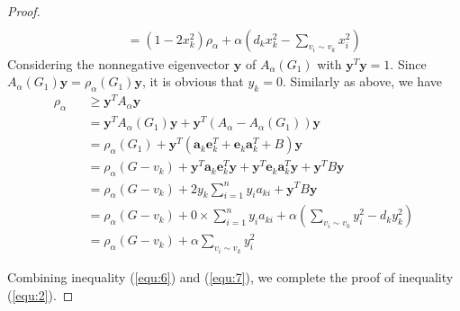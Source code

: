 \documentclass[amsthm]{elsart}
\begin{document}
\begin{proof}
\begin{eqnarray}
\\  \label{equ:6} &&= ( 1 -2 x_k^2)\rho_\alpha + \alpha (d_k x_k^2 - \sum \limits_{v_i \sim v_k}^{} x_i^2 )
\end{eqnarray}
Considering the nonnegative eigenvector $\textbf{y}$ of $A_\alpha(G_1)$ with $\textbf{y}^T\textbf{y} = 1$. Since $A_\alpha(G_1) \textbf{y} = \rho_\alpha(G_1) \textbf{y}$, it is obvious that $y_k = 0$.
Similarly as above, we have \\
\begin{eqnarray}
\nonumber  \rho_\alpha
&&\geqslant \textbf{y} ^T A_\alpha \textbf{y}
\\ \nonumber &&= \textbf{y} ^T A_\alpha(G_1) \textbf{y} + \textbf{y}^T (A_\alpha - A_\alpha(G_1)) \textbf{y}
\\ \nonumber &&= \rho_\alpha(G_1) + \textbf{y}^T (\textbf{a}_k \textbf{e}_k^T + \textbf{e}_k \textbf{a}_k^T + B) \textbf{y}
\\ \nonumber &&= \rho_\alpha(G - v_k) + \textbf{y}^T \textbf{a}_k \textbf{e}_k^T \textbf{y} + \textbf{y}^T \textbf{e}_k \textbf{a}_k^T \textbf{y} + \textbf{y}^T B \textbf{y}
\\ \nonumber &&= \rho_\alpha(G - v_k)
  + 2y_k \sum \limits_{i=1}^{n}y_i a_{ki}
  + \textbf{y}^T B \textbf{y}
\\ \nonumber &&= \rho_\alpha(G - v_k)
  + 0 \times \sum \limits_{i=1}^{n}y_i a_{ki}
  + \alpha  (\sum \limits_{v_i \sim v_k}^{} y_i^2 - d_k y_k^2 )
\\ \label{equ:7}  &&= \rho_\alpha(G - v_k) + \alpha \sum \limits_{v_i \sim v_k}^{} y_i^2
\end{eqnarray}

Combining inequality (\ref{equ:6}) and (\ref{equ:7}), we complete the proof of inequality (\ref{equ:2}).


\end{proof}
\end{document}
